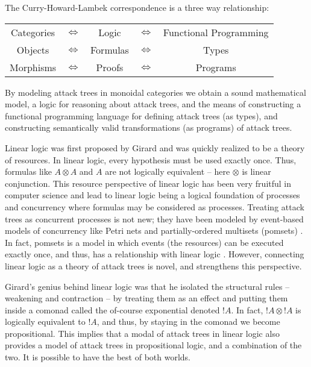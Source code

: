\documentclass{llncs}
\begin{document}
The Curry-Howard-Lambek correspondence is a three way relationship:
\begin{center}
  \footnotesize
  \setlength{\tabcolsep}{7pt}
  \begin{tabular}{ccccc}
    Categories & $\iff$ & Logic    & $\iff$   & Functional Programming\\
    Objects    & $\iff$ & Formulas & $\iff$   & Types    \\
    Morphisms  & $\iff$ & Proofs   & $\iff$   & Programs 
  \end{tabular}
\end{center}
By modeling attack trees in monoidal categories we obtain a sound
mathematical model, a logic for reasoning about attack trees, and the
means of constructing a functional programming language for defining
attack trees (as types), and constructing semantically valid
transformations (as programs) of attack trees.  

Linear logic was first proposed by Girard \cite{Girard:1987} and was
quickly realized to be a theory of resources.  In linear logic, every
hypothesis must be used exactly once.  Thus, formulas like $A \otimes
A$ and $A$ are not logically equivalent -- here $\otimes$ is linear
conjunction.  This resource perspective of linear logic has been very
fruitful in computer science and lead to linear logic being a logical
foundation of processes and concurrency where formulas may be
considered as processes.  Treating attack trees as concurrent
processes is not new; they have been modeled by event-based models of
concurrency like Petri nets and partially-ordered multisets (pomsets)
\cite{Jhawar:2015,Mauw:2006}.  In fact, pomsets is a model in which
events (the resources) can be executed exactly once, and thus, has a
relationship with linear logic \cite{Retore:1997}.  However,
connecting linear logic as a theory of attack trees is novel, and
strengthens this perspective.

Girard's genius behind linear logic was that he isolated the
structural rules -- weakening and contraction -- by treating them as
an effect and putting them inside a comonad called the of-course
exponential denoted $!A$.  In fact, $!A \otimes !A$ is logically
equivalent to $!A$, and thus, by staying in the comonad we become
propositional.  This implies that a modal of attack trees in linear
logic also provides a model of attack trees in propositional logic,
and a combination of the two.  It is possible to have the best of both
worlds.
\end{document}
